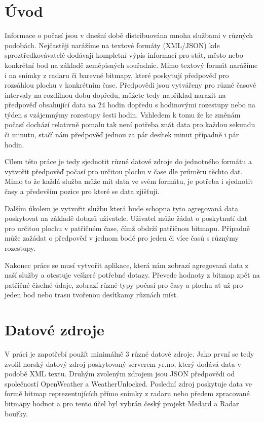 \documentclass[czech,bachelor,dept460,male,csharp,cpdeclaration]{diploma}
\begin{document}
	
	\MakeTitlePages
	
	\chapter{Úvod}
	
	Informace o počasí jsou v dnešní době distribuována mnoha službami v různých podobách. Nejčastěji narážíme na textové formáty (XML/JSON) kde sproztředkovávatelé dodávají kompletní výpis informací pro stát, město nebo konkrétní bod na základě zeměpisných souřadnic. Mimo textový formát narážíme i na snímky z radaru či barevné bitmapy, které poskytují předpověď pro rozsáhlou plochu v konkrétním čase. Předpovědi jsou vytvářeny pro různé časové intervaly na rozdílnou dobu dopředu, můžete tedy například narazit na předpověď obsahující data na 24 hodin dopředu s hodinovými rozestupy nebo na týden s vzájemnýmy rozestupy šesti hodin. Vzhledem k tomu že ke změnám počasí dochází relativně pomalu tak není potřeba znát data pro každou sekundu či minutu, stačí nám předpověď jednou za pár desítek minut případně i pár hodin.
	
	Cílem této práce je tedy sjednotit různé datové zdroje do jednotného formátu a vytvořit předpověď počasí pro určitou plochu v čase dle průměru těchto dat. Mimo to že každá služba může mít data ve svém formátu, je potřeba i sjednotit časy a především pozice pro které se data zjišťují.
	
	Dalším úkolem je vytvořit službu která bude schopna tyto agregovaná data poskytovat na základě dotazů uživatele. Uživatel může žádat o poskytnutí dat pro určitou plochu v patřičném čase, čímž obdrží patřičnou bitmapu. Případně může zažádat o předpověď v jednom bodě pro jeden či více časů s různýmy rozestupy.
	
	Nakonec práce se musí vytvořit aplikace, která nám zobrazí agregovaná data z naší služby a otestuje veškeré potřebné dotazy. Převede hodnoty z bitmap zpět na patřičné číselné údaje, zobrazí různé typy počasí pro časy a plochu ať už pro jeden bod nebo trasu tvořenou desítkamy různách míst.
		
	\chapter{Datové zdroje}
	
	V práci je zapotřebí použít minimálně 3 různé datové zdroje. Jako první se tedy zvolil norský datový zdroj poskytovaný serverem yr.no, který dodává data v podobě XML textu. Druhým zvoleným zdrojem jsou JSON předpovědi od společností OpenWeather a WeatherUnlocked. Poslední zdroj poskytuje data ve formě bitmap reprezentujících přímo snímky z radaru nebo předem zpracované bitmapy hodnot a pro tento účel byl vybrán český projekt Medard a Radar bouřky.
	
\end{document}
